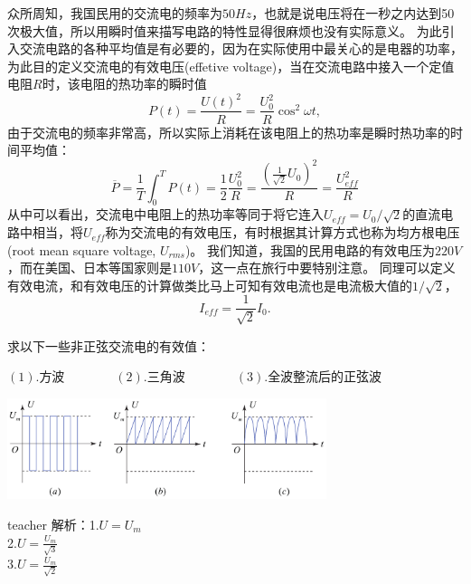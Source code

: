 众所周知，我国民用的交流电的频率为$50\unit{Hz}$，也就是说电压将在一秒之内达到50次极大值，所以用瞬时值来描写电路的特性显得很麻烦也没有实际意义。
为此引入交流电路的各种平均值是有必要的，因为在实际使用中最关心的是电器的功率，为此目的定义交流电的{\heiti 有效电压}(effetive voltage)，当在交流电路中接入一个定值电阻$R$时，该电阻的热功率的瞬时值
\begin{equation}
P(t) = \frac{U(t)^2}{R} = \frac{U_0^2}{R}\cos^2\omega t,
\end{equation}
由于交流电的频率非常高，所以实际上消耗在该电阻上的热功率是瞬时热功率的时间平均值：
\begin{equation}
\overline{P} = \frac{1}{T}\int_0^TP(t) = \frac{1}{2}\frac{U_0^2}{R}  = \frac{(\frac{1}{\sqrt{2}}U_0)^2}{R}= \frac{U_{eff}^2}{R}
\end{equation}
从中可以看出，交流电中电阻上的热功率等同于将它连入$U_{eff} = U_0/\sqrt{2}$的直流电路中相当，将$U_{eff}$称为交流电的有效电压，有时根据其计算方式也称为{\heiti 均方根电压}(root mean square voltage, $U_{rms}$)。
我们知道，我国的民用电路的有效电压为$220\unit{V}$，而在美国、日本等国家则是$110\unit{V}$，这一点在旅行中要特别注意。
同理可以定义有效电流，和有效电压的计算做类比马上可知有效电流也是电流极大值的$1/\sqrt{2}$，
\begin{equation}
I_{eff} = \frac{1}{\sqrt{2}}I_0.
\end{equation}



\begin{example}
求以下一些非正弦交流电的有效值：

$(1). \text{方波}\qquad \qquad (2). \text{三角波}\qquad \qquad (3). \text{全波整流后的正弦波}\qquad \qquad $
\begin{center}
\includegraphics[width = 0.7\textwidth]{images/alt-current-4.pdf} 
\end{center}
\begin{taggedblock}{teacher}
\noindent
解析：1.$U=U_m$
\\2.$U=\frac{U_m}{\sqrt{3}}$
\\3.$U=\frac{U_m}{\sqrt{2}}$
\end{taggedblock}
\end{example}



